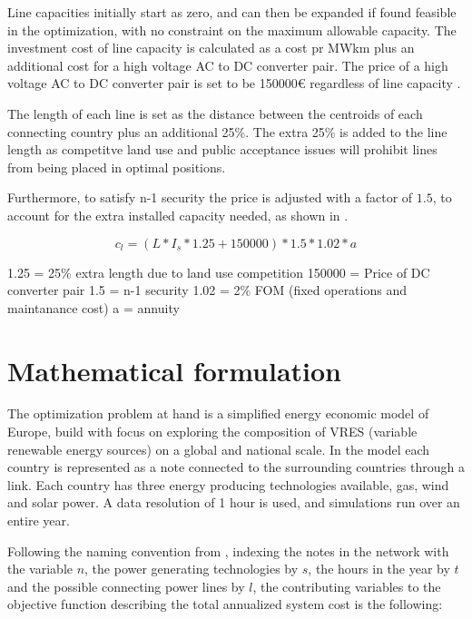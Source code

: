 Line capacities initially start as zero, and can then be expanded if found feasible in the optimization, with no constraint on the maximum allowable capacity. The investment cost of line capacity is calculated as a cost pr MWkm plus an additional cost for a high voltage AC to DC converter pair. The price of a high voltage AC to DC converter pair is set to be 150000€ regardless of line capacity \cite{HAGSPIEL2014654}. 

The length of each line is set as the distance between the centroids of each connecting country plus an additional 25\%. The extra 25\% is added to the line length as competitve land use and public acceptance issues will prohibit lines from being placed in optimal positions. 

Furthermore, to satisfy n-1 security the price is adjusted with a factor of $1.5$, to account for the extra installed capacity needed, as shown in \cite{PyPSA_euro_30_model}. 

\begin{equation}
c_l = \left( L*I_s*1.25+150000 \right) *1.5*1.02*a
\end{equation}

1.25 = 25\% extra length due to land use competition
150000 = Price of DC converter pair
1.5 = n-1 security 
1.02 = 2\% FOM (fixed operations and maintanance cost)
a = annuity 



	
	
	
	
	
	
\section{Mathematical formulation}\label{sec:OptimizationProblem}


The optimization problem at hand is a simplified energy economic model of Europe, build with focus on exploring the composition of VRES (variable renewable energy sources) on a global and national scale. In the model each country is represented as a note connected to the surrounding countries through a link. Each country has three energy producing technologies available, gas, wind and solar power. A data resolution of 1 hour is used, and simulations run over an entire year. 

Following the naming convention from \cite{PyPSA_euro_30_model}, indexing the notes in the network with the variable $n$, the power generating technologies by $s$, the hours in the year by $t$ and the possible connecting power lines by $l$, the contributing variables to the objective function describing the total annualized system cost is the following: 

